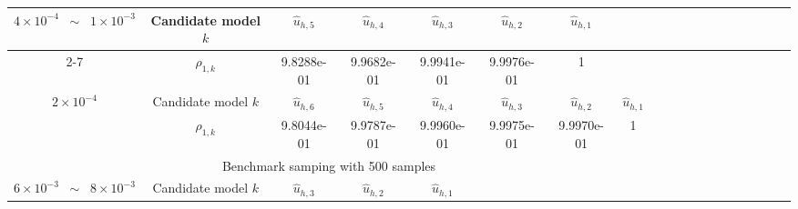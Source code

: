 \begin{table}[ht]
{\begin{tabular}{|c|c|c|c|c|c|c|c|c|c|c|c|c|c|c|c|c|c|c|}
\hline
\multirow{2}{*}{$4\times 10^{-4}\;\;\sim \;\;1\times 10^{-3}$} &\multicolumn{1}{|c|}{Candidate model $k$} &$\widehat u_{h,5}$&$\widehat u_{h,4}$&$\widehat u_{h,3}$&$\widehat u_{h,2}$&$\widehat u_{h,1}$&\multirow{3}{*}{}\\
 \cline{2-7}	
\cline{2-7}	
&\multicolumn{1}{|c|}{$\rho_{1,k}$}&9.8288e-01&9.9682e-01&9.9941e-01  &9.9976e-01&1 &\\
\hline
\multirow{2}{*}{$2\times 10^{-4}$} &\multicolumn{1}{|c|}{Candidate model $k$} &$\widehat u_{h,6}$&$\widehat u_{h,5}$&$\widehat u_{h,4}$&$\widehat u_{h,3}$&$\widehat u_{h,2}$&$\widehat u_{h,1}$\\
\cline{2-8}
\cline{2-8}	
&\multicolumn{1}{|c|}{$\rho_{1,k}$}&9.8044e-01&9.9787e-01&9.9960e-01&9.9975e-01&9.9970e-01   &1\\
\hline
\multicolumn{8}{|c|}{Benchmark samping with 500 samples} \\
\hline
\multirow{2}{*}{$6\times 10^{-3}\;\;\sim \;\;8\times 10^{-3}$} &\multicolumn{1}{|c|}{Candidate model $k$} &$\widehat u_{h,3}$&$\widehat u_{h,2}$&$\widehat u_{h,1}$&\multirow{3}{*}{}&\multirow{3}{*}{}&\multirow{3}{*}{}\\

\end{tabular}}
\end{table}
